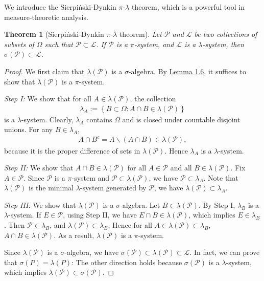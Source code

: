 \documentclass{article}
\numberwithin{equation}{section}
\theoremstyle{plain}
\newtheorem{theorem}{Theorem}[section]
\theoremstyle{definition}
\begin{document}
We introduce the Sierpiński-Dynkin $\pi$-$\lambda$ theorem, which is a powerful tool in measure-theoretic analysis.
\begin{theorem}[Sierpiński-Dynkin $\pi$-$\lambda$ theorem]\label{thm:1.7} Let $\mathscr{P}$ and $\mathscr{L}$ be two collections of subsets of $\Omega$ such that $\mathscr{P}\subset\mathscr{L}$. If $\mathscr{P}$ is a $\pi$-system, and $\mathscr{L}$ is a $\lambda$-system, then $\sigma(\mathscr{P})\subset\mathscr{L}$.
\end{theorem}
\begin{proof}
We first claim that $\lambda(\mathscr{P})$ is a $\sigma$-algebra. By \hyperref[lemma:1.6]{Lemma 1.6}, it suffices to show that $\lambda(\mathscr{P})$ is a $\pi$-system.

\item\textit{Step I:} We show that for all $A\in\lambda(\mathscr{P})$, the collection
\begin{align*}
	\lambda_A:=\left\{B\subset\Omega:A\cap B\in\lambda(\mathscr{P})\right\}
\end{align*}
is a $\lambda$-system. Clearly, $\lambda_A$ contains $\Omega$ and is closed under countable disjoint unions. For any $B\in\lambda_A$,
\begin{align*}
	A\cap B^c = A\backslash (A\cap B)\in\lambda(\mathscr{P}),
\end{align*}
because it is the proper difference of sets in $\lambda(\mathscr{P})$. Hence $\lambda_A$ is a $\lambda$-system.

\item\textit{Step II:} We show that $A\cap B\in\lambda(\mathscr{P})$ for all $A\in\mathscr{P}$ and all $B\in\lambda(\mathscr{P})$. Fix $A\in\mathscr{P}$. Since $\mathscr{P}$ is a $\pi$-system and $\mathscr{P}\subset\lambda(\mathscr{P})$, we have $\mathscr{P}\subset\lambda_A$. Note that $\lambda(\mathscr{P})$ is the minimal $\lambda$-system generated by $\mathscr{P}$, we have $\lambda(\mathscr{P})\subset\lambda_A$.

\item\textit{Step III:} We show that $\lambda(\mathscr{P})$ is a $\sigma$-algebra. Let $B\in\lambda(\mathscr{P})$. By Step I, $\lambda_B$ is a $\lambda$-system. If $E\in\mathscr{P}$, using Step II, we have $E\cap B\in\lambda(\mathscr{P})$, which implies $E\in\lambda_B$. Then $\mathscr{P}\in\lambda_B$, and $\lambda(\mathscr{P})\subset\lambda_B$. Hence for all $A\in\lambda(\mathscr{P})\subset\lambda_B$, $A\cap B\in\lambda(\mathscr{P})$. As a result, $\lambda(\mathscr{P})$ is a $\pi$-system.

Since $\lambda(\mathscr{P})$ is a $\sigma$-algebra, we have $\sigma(\mathscr{P})\subset\lambda(\mathscr{P})\subset\mathscr{L}$. In fact, we can prove that $\sigma(P)=\lambda(P)$: The other direction holds because $\sigma(\mathscr{P})$ is a $\lambda$-system, which implies $\lambda(\mathscr{P})\subset\sigma(\mathscr{P})$.
\end{proof}
\end{document}
